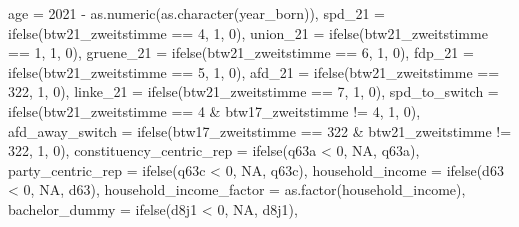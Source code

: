 \documentclass[
]{article}
\newenvironment{Shaded}{\begin{snugshade}}{\end{snugshade}}
\newcommand{\AttributeTok}[1]{\textcolor[rgb]{0.77,0.63,0.00}{#1}}
\newcommand{\ConstantTok}[1]{\textcolor[rgb]{0.00,0.00,0.00}{#1}}
\newcommand{\DecValTok}[1]{\textcolor[rgb]{0.00,0.00,0.81}{#1}}
\newcommand{\FunctionTok}[1]{\textcolor[rgb]{0.00,0.00,0.00}{#1}}
\newcommand{\NormalTok}[1]{#1}
\newcommand{\SpecialCharTok}[1]{\textcolor[rgb]{0.00,0.00,0.00}{#1}}
\begin{document}
\begin{Shaded}
\begin{Highlighting}[]
         \AttributeTok{age =} \DecValTok{2021} \SpecialCharTok{{-}} \FunctionTok{as.numeric}\NormalTok{(}\FunctionTok{as.character}\NormalTok{(year\_born)),}
         \AttributeTok{spd\_21 =} \FunctionTok{ifelse}\NormalTok{(btw21\_zweitstimme }\SpecialCharTok{==} \DecValTok{4}\NormalTok{, }\DecValTok{1}\NormalTok{, }\DecValTok{0}\NormalTok{),}
         \AttributeTok{union\_21 =} \FunctionTok{ifelse}\NormalTok{(btw21\_zweitstimme }\SpecialCharTok{==} \DecValTok{1}\NormalTok{, }\DecValTok{1}\NormalTok{, }\DecValTok{0}\NormalTok{),}
         \AttributeTok{gruene\_21 =} \FunctionTok{ifelse}\NormalTok{(btw21\_zweitstimme }\SpecialCharTok{==} \DecValTok{6}\NormalTok{, }\DecValTok{1}\NormalTok{, }\DecValTok{0}\NormalTok{),}
         \AttributeTok{fdp\_21 =} \FunctionTok{ifelse}\NormalTok{(btw21\_zweitstimme }\SpecialCharTok{==} \DecValTok{5}\NormalTok{, }\DecValTok{1}\NormalTok{, }\DecValTok{0}\NormalTok{),}
         \AttributeTok{afd\_21 =} \FunctionTok{ifelse}\NormalTok{(btw21\_zweitstimme }\SpecialCharTok{==} \DecValTok{322}\NormalTok{, }\DecValTok{1}\NormalTok{, }\DecValTok{0}\NormalTok{),}
         \AttributeTok{linke\_21 =} \FunctionTok{ifelse}\NormalTok{(btw21\_zweitstimme }\SpecialCharTok{==} \DecValTok{7}\NormalTok{, }\DecValTok{1}\NormalTok{, }\DecValTok{0}\NormalTok{), }
         \AttributeTok{spd\_to\_switch =} \FunctionTok{ifelse}\NormalTok{(btw21\_zweitstimme }\SpecialCharTok{==} \DecValTok{4} \SpecialCharTok{\&}\NormalTok{ btw17\_zweitstimme }\SpecialCharTok{!=} \DecValTok{4}\NormalTok{, }\DecValTok{1}\NormalTok{, }\DecValTok{0}\NormalTok{),}
         \AttributeTok{afd\_away\_switch =} \FunctionTok{ifelse}\NormalTok{(btw17\_zweitstimme }\SpecialCharTok{==} \DecValTok{322} \SpecialCharTok{\&}\NormalTok{ btw21\_zweitstimme }\SpecialCharTok{!=} \DecValTok{322}\NormalTok{, }\DecValTok{1}\NormalTok{, }\DecValTok{0}\NormalTok{),}
         \AttributeTok{constituency\_centric\_rep =} \FunctionTok{ifelse}\NormalTok{(q63a }\SpecialCharTok{\textless{}} \DecValTok{0}\NormalTok{, }\ConstantTok{NA}\NormalTok{, q63a),}
         \AttributeTok{party\_centric\_rep =} \FunctionTok{ifelse}\NormalTok{(q63c }\SpecialCharTok{\textless{}} \DecValTok{0}\NormalTok{, }\ConstantTok{NA}\NormalTok{, q63c),}
         \AttributeTok{household\_income =} \FunctionTok{ifelse}\NormalTok{(d63 }\SpecialCharTok{\textless{}} \DecValTok{0}\NormalTok{, }\ConstantTok{NA}\NormalTok{, d63),}
         \AttributeTok{household\_income\_factor =} \FunctionTok{as.factor}\NormalTok{(household\_income),}
         \AttributeTok{bachelor\_dummy =} \FunctionTok{ifelse}\NormalTok{(d8j1 }\SpecialCharTok{\textless{}} \DecValTok{0}\NormalTok{, }\ConstantTok{NA}\NormalTok{, d8j1),}

\end{Highlighting}
\end{Shaded}
\end{document}
